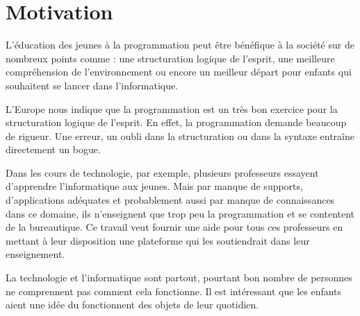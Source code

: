 \section{Motivation}
\label{intro-motivation}
L'éducation des jeunes à la programmation peut être bénéfique à la société sur de nombreux points comme : une structuration logique de l'esprit, une meilleure compréhension de l'environnement ou encore un meilleur départ pour enfants qui souhaitent se lancer dans l'informatique.

L'Europe \cite{rapport-europeen} nous indique  que la programmation est un très bon exercice pour la structuration logique de l'esprit. En effet, la programmation demande beaucoup de rigueur. Une erreur, un oubli dans la structuration ou dans la syntaxe entraîne directement un bogue. %

Dans les cours de technologie, par exemple, plusieurs professeurs essayent d'apprendre l'informatique aux jeunes. Mais par manque de supports, d'applications adéquates et probablement aussi par manque de connaissances dans ce domaine, ils n'enseignent que trop peu la programmation et se contentent de la bureautique. Ce travail veut fournir une aide pour tous ces professeurs en mettant à leur disposition une plateforme qui les soutiendrait dans leur enseignement.

La technologie et l'informatique sont partout, pourtant bon nombre de personnes ne comprennent pas comment cela fonctionne. Il est intéressant que les enfants aient une idée du fonctionnent des objets de leur quotidien.
